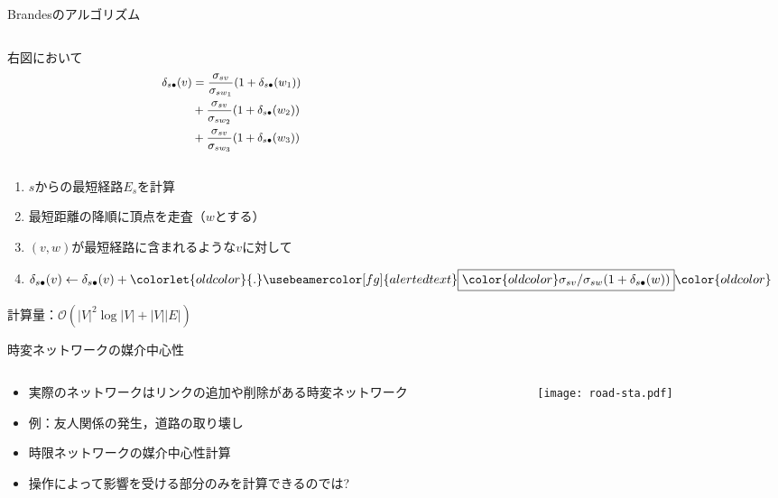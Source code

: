 \documentclass[dvipdfmx,fleqn]{beamer}
\begin{document}
\begin{frame}{Brandesのアルゴリズム}
  \begin{columns}
    \begin{column}{.49\textwidth}
      右図において
      \begin{equation*}\small
        \begin{aligned}
          \delta_{s\bullet}(v)&=\frac{\sigma_{sv}}{\sigma_{sw_1}}(1+\delta_{s\bullet}(w_1)) \\
          &+\frac{\sigma_{sv}}{\sigma_{sw_2}}(1+\delta_{s\bullet}(w_2)) \\
          &+\frac{\sigma_{sv}}{\sigma_{sw_3}}(1+\delta_{s\bullet}(w_3))
        \end{aligned}
      \end{equation*}
    \end{column}
    \begin{column}{.49\textwidth}
      \centering
      \def\svgwidth{.9\columnwidth}
      
    \end{column}
  \end{columns}
  \medskip
  \begin{enumerate}
  \item $s$からの最短経路$E_s$を計算
  \item 最短距離の降順に頂点を走査（$w$とする）
  \item $(v,w)$が最短経路に含まれるような$v$に対して
  \item[] $\delta_{s\bullet}(v)\gets\delta_{s\bullet}(v)+\colorlet{oldcolor}{.}\usebeamercolor[fg]{alerted text}\fbox{$\color{oldcolor}\sigma_{sv}/\sigma_{sw}(1+\delta_{s\bullet}(w))$}\color{oldcolor}$
  \end{enumerate}
  計算量：\alert{$\mathcal{O}(|V|^2\log |V|+|V||E|)$}
\end{frame}

\begin{frame}{時変ネットワークの媒介中心性}
  \begin{columns}
    \begin{column}{.5\textwidth}
      \begin{itemize}
      \item 実際のネットワークはリンクの追加や削除がある\alert{時変ネットワーク}
      \item[] 例：友人関係の発生，道路の取り壊し
      \item 時限ネットワークの媒介中心性計算
      \item 操作によって影響を受ける部分のみを計算できるのでは?
      \end{itemize}
    \end{column}
    \begin{column}{.5\textwidth}
      \texttt{[image: road-sta.pdf]}
    \end{column}
  \end{columns}
\end{frame}
\end{document}
